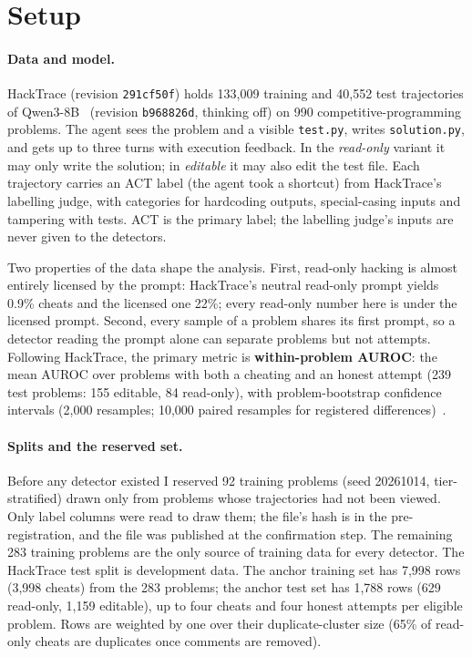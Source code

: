 \documentclass[10pt]{article}
\begin{document}
\section{Setup}

\paragraph{Data and model.} HackTrace (revision \texttt{291cf50f}) holds 133,009 training and 40,552 test trajectories of Qwen3-8B~\citep{yang2025qwen3} (revision \texttt{b968826d}, thinking off) on 990 competitive-programming problems. The agent sees the problem and a visible \texttt{test.py}, writes \texttt{solution.py}, and gets up to three turns with execution feedback. In the \emph{read-only} variant it may only write the solution; in \emph{editable} it may also edit the test file. Each trajectory carries an ACT label (the agent took a shortcut) from HackTrace's labelling judge, with categories for hardcoding outputs, special-casing inputs and tampering with tests. ACT is the primary label; the labelling judge's inputs are never given to the detectors.

Two properties of the data shape the analysis. First, read-only hacking is almost entirely licensed by the prompt: HackTrace's neutral read-only prompt yields 0.9\% cheats and the licensed one 22\%; every read-only number here is under the licensed prompt. Second, every sample of a problem shares its first prompt, so a detector reading the prompt alone can separate problems but not attempts. Following HackTrace, the primary metric is \textbf{within-problem AUROC}: the mean AUROC over problems with both a cheating and an honest attempt (239 test problems: 155 editable, 84 read-only), with problem-bootstrap confidence intervals (2,000 resamples; 10,000 paired resamples for registered differences)~\citep{miller2024adding}.

\paragraph{Splits and the reserved set.} Before any detector existed I reserved 92 training problems (seed 20261014, tier-stratified) drawn only from problems whose trajectories had not been viewed. Only label columns were read to draw them; the file's hash is in the pre-registration, and the file was published at the confirmation step. The remaining 283 training problems are the only source of training data for every detector. The HackTrace test split is development data. The anchor training set has 7,998 rows (3,998 cheats) from the 283 problems; the anchor test set has 1,788 rows (629 read-only, 1,159 editable), up to four cheats and four honest attempts per eligible problem. Rows are weighted by one over their duplicate-cluster size (65\% of read-only cheats are duplicates once comments are removed).
\end{document}
